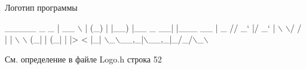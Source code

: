 Логотип программы 
\begin{DoxyCode}
 \_\_\_\_\_           \_ \_      
|  \_\_ \(\backslash\)         | (\_)     
| |\_\_) |\_\_ \_  \_\_| |\_\_\_  \_\_
|  \_  \textcolor{comment}{// \_` |/ \_` | \(\backslash\) \(\backslash\)/ /}
| | \(\backslash\) \(\backslash\) (\_| | (\_| | |>  < 
|\_|  \(\backslash\)\_\(\backslash\)\_\_,\_|\(\backslash\)\_\_,\_|\_/\_/\(\backslash\)\_\(\backslash\)
\end{DoxyCode}
 

См. определение в файле Logo.\+h строка 52

